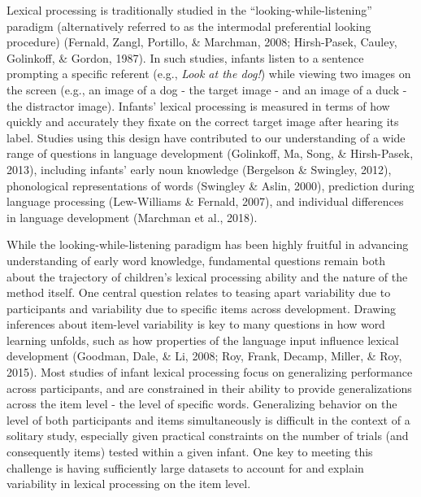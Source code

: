 \documentclass[10pt, letterpaper]{article}
\begin{document}
Lexical processing is traditionally studied in the
``looking-while-listening'' paradigm (alternatively referred to as the
intermodal preferential looking procedure) (Fernald, Zangl, Portillo, \&
Marchman, 2008; Hirsh-Pasek, Cauley, Golinkoff, \& Gordon, 1987). In
such studies, infants listen to a sentence prompting a specific referent
(e.g., \emph{Look at the dog!}) while viewing two images on the screen
(e.g., an image of a dog - the target image - and an image of a duck -
the distractor image). Infants' lexical processing is measured in terms
of how quickly and accurately they fixate on the correct target image
after hearing its label. Studies using this design have contributed to
our understanding of a wide range of questions in language development
(Golinkoff, Ma, Song, \& Hirsh-Pasek, 2013), including infants' early
noun knowledge (Bergelson \& Swingley, 2012), phonological
representations of words (Swingley \& Aslin, 2000), prediction during
language processing (Lew-Williams \& Fernald, 2007), and individual
differences in language development (Marchman et al., 2018).

While the looking-while-listening paradigm has been highly fruitful in
advancing understanding of early word knowledge, fundamental questions
remain both about the trajectory of children's lexical processing
ability and the nature of the method itself. One central question
relates to teasing apart variability due to participants and variability
due to specific items across development. Drawing inferences about
item-level variability is key to many questions in how word learning
unfolds, such as how properties of the language input influence lexical
development (Goodman, Dale, \& Li, 2008; Roy, Frank, Decamp, Miller, \&
Roy, 2015). Most studies of infant lexical processing focus on
generalizing performance across participants, and are constrained in
their ability to provide generalizations across the item level - the
level of specific words. Generalizing behavior on the level of both
participants and items simultaneously is difficult in the context of a
solitary study, especially given practical constraints on the number of
trials (and consequently items) tested within a given infant. One key to
meeting this challenge is having sufficiently large datasets to account
for and explain variability in lexical processing on the item level.
\end{document}
